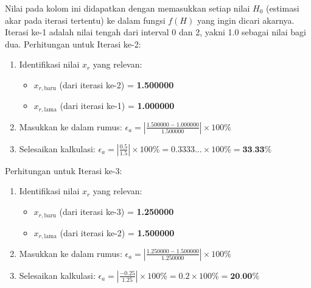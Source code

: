 \documentclass[conference]{IEEEtran}
\begin{document}
Nilai pada kolom ini didapatkan dengan memasukkan setiap nilai \textbf{$H_0$} (estimasi akar pada iterasi tertentu) ke dalam fungsi $f(H)$ yang ingin dicari akarnya. Iterasi ke-1 adalah nilai tengah dari interval 0 dan 2, yakni 1.0 sebagai nilai bagi dua.
Perhitungan untuk Iterasi ke-2:
\begin{enumerate}
    \item Identifikasi nilai $x_r$ yang relevan:
    \begin{itemize}
        \item $x_{r, \text{baru}}$ (dari iterasi ke-2) = \textbf{1.500000}
        \item $x_{r, \text{lama}}$ (dari iterasi ke-1) = \textbf{1.000000}
    \end{itemize}
    
    \item Masukkan ke dalam rumus:
    $\epsilon_a = \left| \frac{1.500000 - 1.000000}{1.500000} \right| \times 100\%$
    
    \item Selesaikan kalkulasi:
    $\epsilon_a = \left| \frac{0.5}{1.5} \right| \times 100\% = 0.3333... \times 100\% = \textbf{33.33\%}$
\end{enumerate}
Perhitungan untuk Iterasi ke-3:
\begin{enumerate}
    \item Identifikasi nilai $x_r$ yang relevan:
    \begin{itemize}
        \item $x_{r, \text{baru}}$ (dari iterasi ke-3) = \textbf{1.250000}
        \item $x_{r, \text{lama}}$ (dari iterasi ke-2) = \textbf{1.500000}
    \end{itemize}
    
    \item Masukkan ke dalam rumus:
    $\epsilon_a = \left| \frac{1.250000 - 1.500000}{1.250000} \right| \times 100\%$
    
    \item Selesaikan kalkulasi:
    $\epsilon_a = \left| \frac{-0.25}{1.25} \right| \times 100\% = 0.2 \times 100\% = \textbf{20.00\%}$
\end{enumerate}
\end{document}
